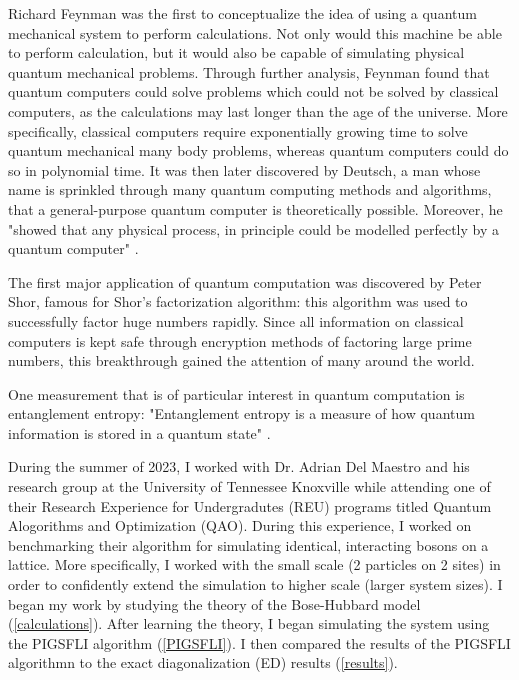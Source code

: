 

Richard Feynman was the first to conceptualize the idea of using a quantum mechanical system to perform calculations. Not only would this machine be able to perform calculation, but it would also be capable of simulating physical quantum mechanical problems. Through further analysis, Feynman found that quantum computers could solve problems which could not be solved by classical computers, as the calculations may last longer than the age of the universe. More specifically, classical computers require exponentially growing time to solve quantum mechanical many body problems, whereas quantum computers could do so in polynomial time. It was then later discovered by Deutsch, a man whose name is sprinkled through many quantum computing methods and algorithms, that a general-purpose quantum computer is theoretically possible. Moreover, he "showed that any physical process, in principle could be modelled perfectly by a quantum computer" \cite{singh_study_2005}.

The first major application of quantum computation was discovered by Peter Shor, famous for Shor's factorization algorithm: this algorithm was used to successfully factor huge numbers rapidly. Since all information on classical computers is kept safe through encryption methods of factoring large prime numbers, this breakthrough gained the attention of many around the world.

One measurement that is of particular interest in quantum computation is entanglement entropy: "Entanglement entropy is a measure of how quantum information is stored in a quantum state" \cite{hartman_lectures_2015}.

During the summer of 2023, I worked with Dr. Adrian Del Maestro and his research group at the University of Tennessee Knoxville while attending one of their Research Experience for Undergradutes (REU) programs titled Quantum Alogorithms and Optimization (QAO). During this experience, I worked on benchmarking their algorithm for simulating identical, interacting bosons on a lattice. More specifically, I worked with the small scale (2 particles on 2 sites) in order to confidently extend the simulation to higher scale (larger system sizes). I began my work by studying the theory of the Bose-Hubbard model (\cref*{calculations}). After learning the theory, I began simulating the system using the PIGSFLI algorithm (\cref*{PIGSFLI}). I then compared the results of the PIGSFLI algorithmn to the exact diagonalization (ED) results (\cref*{results}). 



